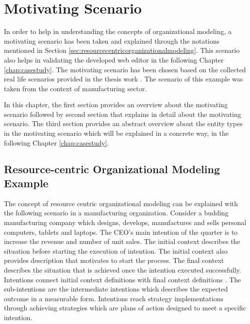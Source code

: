 \chapter{Motivating Scenario}
\label{chap:motivatingScenario}

In order to help in understanding the concepts of organizational modeling, a motivating scenario has been taken and explained through the notations mentioned in Section \ref{sec:resourcecentricorganizationalmodeling}. This scenario also helps in validating the developed web editor in the following Chapter \ref{chap:casestudy}. The motivating scenario has been chosen based on the collected real life scenarios provided in the thesis work \cite{Sierr2015}. The scenario of this example was taken from the context of manufacturing sector. 

In this chapter, the first section provides an overview about the motivating scenario followed by second section that explains in detail about the motivating scenario. The third section provides an abstract overview about the entity types in the motivating scenario which will be explained in a concrete way, in the following Chapter \ref{chap:casestudy}.

\section{Resource-centric Organizational Modeling Example}
\label{sec:scenario}
 The concept of resource centric organizational modeling can be explained with the following scenario in a manufacturing organization. Consider a budding manufacturing company which designs, develops, manufactures and sells personal computers, tablets and laptops. The CEO's main intention of the quarter is to increase the revenue and number of unit sales. The initial context describes the situation before starting the execution of intention. The initial context also provides description that motivates to start the process. The final context describes the situation that is achieved once the intention executed successfully. Intentions connect initial context definitions with final context definitions \cite{Sungur2014a}. The sub-intentions are the intermediate intentions which describes the expected outcome in a measurable form. Intentions reach strategy implementations through achieving strategies which are plans of action designed to meet a specific intention. 
 
